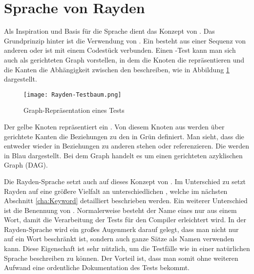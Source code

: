 
\section{Sprache von Rayden}

Als Inspiration und Basis für die Sprache dient das Konzept von . Das Grundprinzip hinter  ist die Verwendung von . Ein  besteht aus einer Sequenz von anderen  oder ist mit einem Codestück verbunden. Einen -Test kann man sich auch als gerichteten Graph vorstellen, in dem die Knoten die  repräsentieren und die Kanten die Abhängigkeit zwischen den  beschreiben, wie in Abbildung \ref{fig:test-graph} dargestellt.

\begin{figure}[h]
\centering
\texttt{[image: Rayden-Testbaum.png]}
\caption{Graph-Repräsentation eines Tests}
\label{fig:test-graph}
\end{figure}

\SuperPar
Der gelbe Knoten repräsentiert ein . Von diesem Knoten aus werden über gerichtete Kanten die Beziehungen zu den  in Grün definiert. Man sieht, dass die  entweder wieder in Beziehungen zu anderen  stehen oder  referenzieren. Die  werden in Blau dargestellt. Bei dem Graph handelt es um einen gerichteten azyklischen Graph (DAG).

\SuperPar
Die Rayden-Sprache setzt auch auf dieses Konzept von . Im Unterschied zu  setzt Rayden auf eine größere Vielfalt an unterschiedlichen , welche im nächsten Abschnitt \ref{cha:Keyword} detailliert beschrieben werden. Ein weiterer Unterschied ist die Benennung von . Normalerweise besteht der Name eines  nur aus einem Wort, damit die Verarbeitung der Tests für den Compiler erleichtert wird. In der Rayden-Sprache wird ein großes Augenmerk darauf gelegt, dass man nicht nur auf ein Wort beschränkt ist, sondern auch ganze Sätze als Namen verwenden kann. Diese Eigenschaft ist sehr nützlich, um die Testfälle wie in einer natürlichen Sprache beschreiben zu können. Der Vorteil ist, dass man somit ohne weiteren Aufwand eine ordentliche Dokumentation des Tests bekommt.

